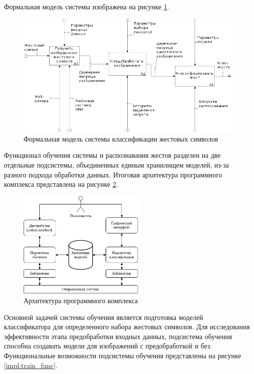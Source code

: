 Формальная модель системы изображена на рисунке \ref{impl:idef0}.

\begin{figure}[!h]
	\centering
	\includegraphics[width=\textwidth]{inc/img/idef0}
	\caption{Формальная модель системы классификации жестовых символов}
	\label{impl:idef0}
\end{figure}

Функционал обучения системы и распознавания жестов разделен на две отдельные подсистемы, объединенных единым хранилищем моделей, из-за разного подхода обработки данных. Итоговая архитектура программного комплекса представлена на рисунке \ref{impl:arch}.

\begin{figure}[!h]
	\centering
	\includegraphics[width=0.55\textwidth]{inc/img/arch}
	\caption{Архитектура программного комплекса}
	\label{impl:arch}
\end{figure}

Основной задачей системы обучения является подготовка моделей классификатора для определенного набора жестовых символов. Для исследования эффективности этапа предобработки входных данных, подсистема обучения способна создавать модели для изображений с предобработкой и без. Функциональные возможности подсистемы обучения представлены на рисунке \ref{impl:train_func}.

